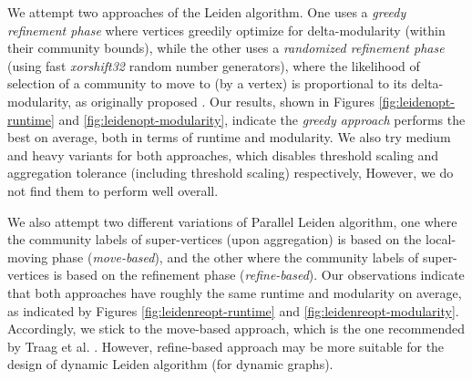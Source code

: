 We attempt two approaches of the Leiden algorithm. One uses a \textit{greedy refinement phase} where vertices greedily optimize for delta-modularity (within their community bounds), while the other uses a \textit{randomized refinement phase} (using fast \textit{xorshift32} random number generators), where the likelihood of selection of a community to move to (by a vertex) is proportional to its delta-modularity, as originally proposed \cite{com-traag19}. Our results, shown in Figures \ref{fig:leidenopt-runtime} and \ref{fig:leidenopt-modularity}, indicate the \textit{greedy approach} performs the best on average, both in terms of runtime and modularity. We also try medium and heavy variants for both approaches, which disables threshold scaling and aggregation tolerance (including threshold scaling) respectively, However, we do not find them to perform well overall.


We also attempt two different variations of Parallel Leiden algorithm, one where the community labels of super-vertices (upon aggregation) is based on the local-moving phase (\textit{move-based}), and the other where the community labels of super-vertices is based on the refinement phase (\textit{refine-based}). Our observations indicate that both approaches have roughly the same runtime and modularity on average, as indicated by Figures \ref{fig:leidenreopt-runtime} and \ref{fig:leidenreopt-modularity}. Accordingly, we stick to the move-based approach, which is the one recommended by Traag et al. \cite{com-traag19}. However, refine-based approach may be more suitable for the design of dynamic Leiden algorithm (for dynamic graphs).











